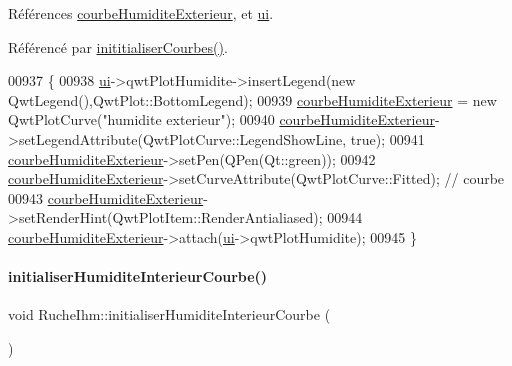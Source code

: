 Références \hyperlink{class_ruche_ihm_a0c9d769a392e3c1332f8908cd9d558eb}{courbe\+Humidite\+Exterieur}, et \hyperlink{class_ruche_ihm_a64786058bd7f88ca2f1e9743bb27c25b}{ui}.



Référencé par \hyperlink{class_ruche_ihm_a4fe15b22538611ad9ffc4d807f8b78fd}{inititialiser\+Courbes()}.


\begin{DoxyCode}
00937 \{
00938     \hyperlink{class_ruche_ihm_a64786058bd7f88ca2f1e9743bb27c25b}{ui}->qwtPlotHumidite->insertLegend(\textcolor{keyword}{new} QwtLegend(),QwtPlot::BottomLegend);
00939     \hyperlink{class_ruche_ihm_a0c9d769a392e3c1332f8908cd9d558eb}{courbeHumiditeExterieur} = \textcolor{keyword}{new} QwtPlotCurve(\textcolor{stringliteral}{"humidite exterieur"});
00940     \hyperlink{class_ruche_ihm_a0c9d769a392e3c1332f8908cd9d558eb}{courbeHumiditeExterieur}->setLegendAttribute(QwtPlotCurve::LegendShowLine, \textcolor{keyword}{true});
00941     \hyperlink{class_ruche_ihm_a0c9d769a392e3c1332f8908cd9d558eb}{courbeHumiditeExterieur}->setPen(QPen(Qt::green));
00942     \hyperlink{class_ruche_ihm_a0c9d769a392e3c1332f8908cd9d558eb}{courbeHumiditeExterieur}->setCurveAttribute(QwtPlotCurve::Fitted); \textcolor{comment}{// courbe}
00943     \hyperlink{class_ruche_ihm_a0c9d769a392e3c1332f8908cd9d558eb}{courbeHumiditeExterieur}->setRenderHint(QwtPlotItem::RenderAntialiased);
00944     \hyperlink{class_ruche_ihm_a0c9d769a392e3c1332f8908cd9d558eb}{courbeHumiditeExterieur}->attach(\hyperlink{class_ruche_ihm_a64786058bd7f88ca2f1e9743bb27c25b}{ui}->qwtPlotHumidite);
00945 \}
\end{DoxyCode}
\mbox{\label{class_ruche_ihm_a0ab45ef3e5c512ff1bb4fcfaaa8872bd}} 
\paragraph{\texorpdfstring{initialiser\+Humidite\+Interieur\+Courbe()}{initialiserHumiditeInterieurCourbe()}}
{\footnotesize\ttfamily void Ruche\+Ihm\+::initialiser\+Humidite\+Interieur\+Courbe (\begin{DoxyParamCaption}{ }\end{DoxyParamCaption})\hspace{0.3cm}{\ttfamily [private]}}



